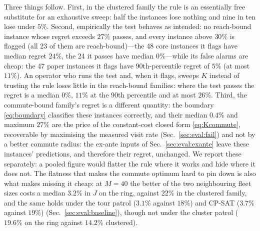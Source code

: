 \documentclass[journal,outdir=./]{IEEEtran}
\begin{document}
Three things follow. First, in the clustered family the rule is an essentially free substitute for an exhaustive sweep: half the instances lose nothing and nine in ten lose under $5\%$. Second, empirically the test behaves as intended: no reach-bound instance whose regret exceeds $27\%$ passes, and every instance above $30\%$ is flagged (all 23 of them are reach-bound)---the 48 core instances it flags have median regret $24\%$, the 24 it passes have median $0\%$---while its false alarms are cheap: the 47 paper instances it flags have $90$th-percentile regret of $5\%$ (at most $11\%$). An operator who runs the test and, when it flags, sweeps $K$ instead of trusting the rule loses little in the reach-bound families: where the test passes the regret is a median $0\%$, $11\%$ at the 90th percentile and at most $26\%$. Third, the commute-bound family's regret is a different quantity: the boundary \eqref{eq:boundary} classifies these instances correctly, and their median $0.4\%$ and maximum $27\%$ are the price of the constant-cost closed form \eqref{eq:Kcommute}, recoverable by maximising the measured visit rate (Sec.~\ref{sec:eval:fail}) and not by a better commute radius: the ex-ante inputs of Sec.~\ref{sec:eval:exante} leave these instances' predictions, and therefore their regret, unchanged. We report these separately: a pooled figure would flatter the rule where it works and hide where it does not. The flatness that makes the commute optimum hard to pin down is also what makes missing it cheap: at $M=40$ the better of the two neighbouring fleet sizes costs a median $3.2\%$ in $J$ on the ring, against $22\%$ in the clustered family, and the same holds under the tour patrol ($3.1\%$ against $18\%$) and CP-SAT ($3.7\%$ against $19\%$) (Sec.~\ref{sec:eval:baseline}), though not under the cluster patrol ($19.6\%$ on the ring against $14.2\%$ clustered).
\end{document}
